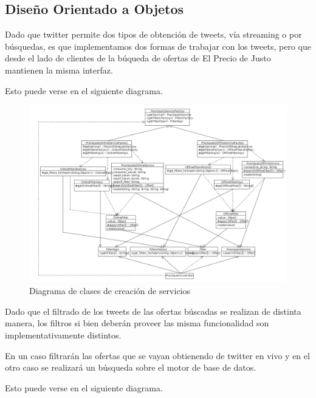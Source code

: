 \subsection{Diseño Orientado a Objetos}

Dado que twitter permite dos tipos de obtención de tweets, vía streaming o por búsquedas, es que implementamos dos formas de trabajar con los tweets, pero que desde el lado de clientes de la búqueda de ofertas de El Precio de Justo mantienen la misma interfaz.

Esto puede verse en el siguiente diagrama.

\begin{figure}[cht]
\includegraphics[width=0.8\paperwidth]{./imgs/class_diagram_service_factory_v2.png}
\caption{Diagrama de clases de creación de servicios}
\end{figure}

Dado que el filtrado de los tweets de las ofertas búscadas se realizan de distinta manera, los filtros si bien deberán proveer las misma funcionalidad son implementativamente distintos.

En un caso filtrarán las ofertas que se vayan obtienendo de twitter en vivo y en el otro caso se realizará un búsqueda sobre el motor de base de datos.

Esto puede verse en el siguiente diagrama. 

